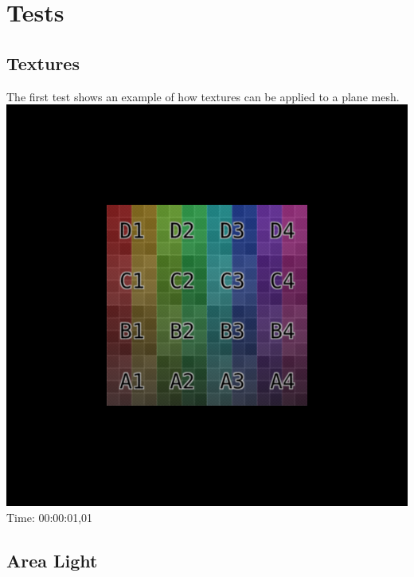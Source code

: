 \documentclass[12pt]{article} %
\begin{document}
\section{Tests} %


\subsection{Textures} %

The first test shows an example of how textures can be applied to a plane mesh.\\
\includegraphics[width=\linewidth]{Homework4/tests/01_textured.png}
Time: 00:00:01,01


\subsection{Area Light} %
\end{document}
